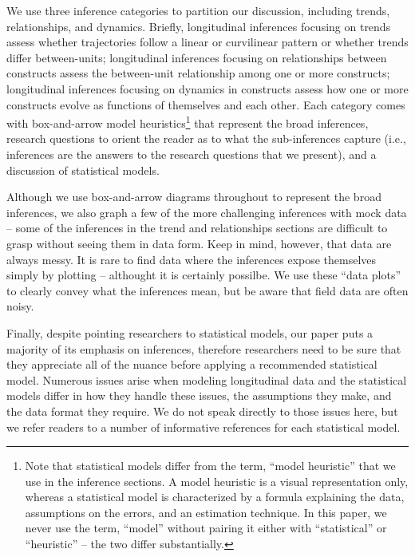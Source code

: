 \documentclass[english,,man]{apa6}
\let\rmarkdownfootnote\footnote%
\def\footnote{\protect\rmarkdownfootnote}
\theoremstyle{definition}
\theoremstyle{definition}
\theoremstyle{definition}
\theoremstyle{remark}
\begin{document}
We use three inference categories to partition our discussion, including
trends, relationships, and dynamics. Briefly, longitudinal inferences
focusing on trends assess whether trajectories follow a linear or
curvilinear pattern or whether trends differ between-units; longitudinal
inferences focusing on relationships between constructs assess the
between-unit relationship among one or more constructs; longitudinal
inferences focusing on dynamics in constructs assess how one or more
constructs evolve as functions of themselves and each other. Each
category comes with box-and-arrow model heuristics\footnote{Note that
  statistical models differ from the term, \enquote{model heuristic}
  that we use in the inference sections. A model heuristic is a visual
  representation only, whereas a statistical model is characterized by a
  formula explaining the data, assumptions on the errors, and an
  estimation technique. In this paper, we never use the term,
  \enquote{model} without pairing it either with \enquote{statistical}
  or \enquote{heuristic} -- the two differ substantially.} that
represent the broad inferences, research questions to orient the reader
as to what the sub-inferences capture (i.e., inferences are the answers
to the research questions that we present), and a discussion of
statistical models.

Although we use box-and-arrow diagrams throughout to represent the broad
inferences, we also graph a few of the more challenging inferences with
mock data -- some of the inferences in the trend and relationships
sections are difficult to grasp without seeing them in data form. Keep
in mind, however, that data are always messy. It is rare to find data
where the inferences expose themselves simply by plotting -- althought
it is certainly possilbe. We use these \enquote{data plots} to clearly
convey what the inferences mean, but be aware that field data are often
noisy.

Finally, despite pointing researchers to statistical models, our paper
puts a majority of its emphasis on inferences, therefore researchers
need to be sure that they appreciate all of the nuance before applying a
recommended statistical model. Numerous issues arise when modeling
longitudinal data and the statistical models differ in how they handle
these issues, the assumptions they make, and the data format they
require. We do not speak directly to those issues here, but we refer
readers to a number of informative references for each statistical
model.
\end{document}
